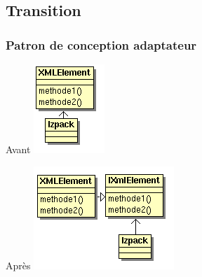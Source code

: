 \subsection{Transition}
\begin{frame}\frametitle{Patron de conception adaptateur}
\begin{minipage}[c]{.46\linewidth}
\begin{beamerboxesrounded}[shadow=true]{Avant}
	\includegraphics[width=.9\linewidth]{../image/sol_casInitial.png}
\end{beamerboxesrounded}
\end{minipage}
\hfill
\begin{minipage}[c]{.46\linewidth}
\begin{beamerboxesrounded}[shadow=true]{Après}
	\includegraphics[width=.9\linewidth]{../image/sol_extractionInterface.png}
\end{beamerboxesrounded}
\end{minipage}
\end{frame}
